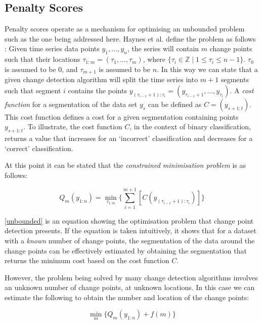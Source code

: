 \documentclass[../main.tex]{subfiles}
\begin{document}
\subsection{Penalty Scores}

Penalty scores operate as a mechanism for optimising an unbounded problem such as the one being addressed here. Haynes et al. define the problem as follows \cite{Haynes2014}: Given time series data points $y_1,\ldots,y_n$, the series will contain $m$ change points such that their locations $\tau_{1:m} = (\tau_1,\ldots,\tau_m)$, where $\{\tau_i \in \mathbb{Z} \mid 1 \leqslant \tau_i \leqslant n-1\}$. $\tau_0$ is assumed to be 0, and $\tau_{m+1}$ is assumed to be $n$. In this way we can state that a given change detection algorithm will split the time series into $m + 1$ segments such that segment $i$ contains the points $y_{(\tau_{i-1}+1):\tau_i} = (y_{\tau_{i-1} + 1},\dots,y_{\tau_i})$. A \emph{cost function} for a segmentation of the data set $y_s$ can be defined as $C = (y_{s+1:t})$. This cost function defines a cost for a given segmentation containing points $y_{s+1:t}$. To illustrate, the cost function $C$, in the context of binary classification, returns a value that increases for an `incorrect' classification and decreases for a `correct' classification.

At this point it can be stated that the \emph{constrained minimisation problem} is as follows:

\begin{equation}
\label{unbounded}
    Q_m(y_{1:n}) = \min_{\tau_{1:m}} \Bigg\{ \sum^{m+1}_{i=1}[C(y_{(\tau_{i - 1} + 1):\tau_i})] \Bigg\}
\end{equation}

\autoref{unbounded} is an equation showing the optimisation problem that change point detection presents. If the equation is taken intuitively, it shows that for a dataset with a \emph{known} number of change points, the segmentation of the data around the change points can be effectively estimated by obtaining the segmentation that returns the minimum cost based on the cost function $C$.

However, the problem being solved by many change detection algorithms involves an unknown number of change points, at unknown locations. In this case we can estimate the following to obtain the number and location of the change points:

\begin{equation}
\label{eqn:penalty}
    \min_{m} \big\{ Q_m(y_{1:n}) + f(m) \big\}
\end{equation}
\end{document}
